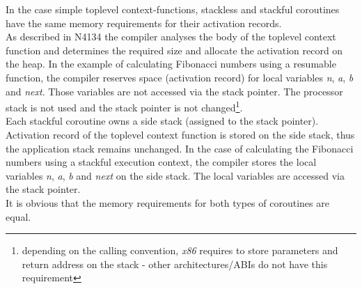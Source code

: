 In the case simple toplevel context-functions, stackless and stackful coroutines
have the same memory requirements for their activation records.\\
\newline
As described in N4134 the compiler analyses the body of the toplevel context
function and determines the required size and allocate the activation record on
the heap.
In the example of calculating Fibonacci numbers using a resumable function, the
compiler reserves space (activation record) for local variables \emph{n},
\emph{a}, \emph{b} and \emph{next}. Those variables are not accessed via the
stack pointer. The processor stack is not used and the stack pointer is not
changed\footnote{depending on the calling convention, \emph{x86} requires to
store parameters and return address on the stack - other architectures/ABIs do
not have this requirement}.\\
\newline
Each stackful coroutine owns a side stack (assigned to the stack pointer).
Activation record of the toplevel context function is stored on the side stack,
thus the application stack remains unchanged.
In the case of calculating the Fibonacci numbers using a stackful execution
context, the compiler stores the local variables \emph{n}, \emph{a},
\emph{b} and \emph{next} on the side stack. The local variables are accessed
via the stack pointer.\\
\newline
It is obvious that the memory requirements for both types of coroutines are
equal.

